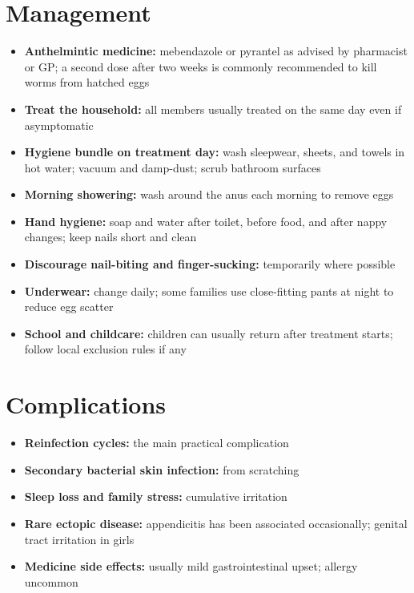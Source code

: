 \section*{Management}
\begin{itemize}
    \item \textbf{Anthelmintic medicine:} mebendazole or pyrantel as advised by pharmacist or GP; a second dose after two weeks is commonly recommended to kill worms from hatched eggs
    \item \textbf{Treat the household:} all members usually treated on the same day even if asymptomatic
    \item \textbf{Hygiene bundle on treatment day:} wash sleepwear, sheets, and towels in hot water; vacuum and damp-dust; scrub bathroom surfaces
    \item \textbf{Morning showering:} wash around the anus each morning to remove eggs
    \item \textbf{Hand hygiene:} soap and water after toilet, before food, and after nappy changes; keep nails short and clean
    \item \textbf{Discourage nail-biting and finger-sucking:} temporarily where possible
    \item \textbf{Underwear:} change daily; some families use close-fitting pants at night to reduce egg scatter
    \item \textbf{School and childcare:} children can usually return after treatment starts; follow local exclusion rules if any
\end{itemize}

\section*{Complications}
\begin{itemize}
    \item \textbf{Reinfection cycles:} the main practical complication
    \item \textbf{Secondary bacterial skin infection:} from scratching
    \item \textbf{Sleep loss and family stress:} cumulative irritation
    \item \textbf{Rare ectopic disease:} appendicitis has been associated occasionally; genital tract irritation in girls
    \item \textbf{Medicine side effects:} usually mild gastrointestinal upset; allergy uncommon
\end{itemize}

